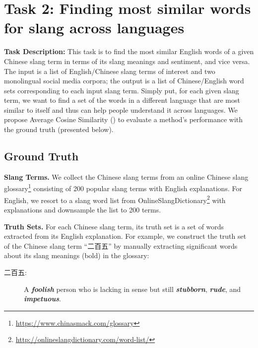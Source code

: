 \section{Task 2: Finding most similar words for slang across languages}
\label{sec:bleis}
\textbf{Task Description:} This task is to find the most similar English words of a given Chinese slang term in terms of its slang meanings and sentiment, and vice versa. 
The input is a list of English/Chinese slang terms of interest and two monolingual social media corpora; the output is a list of Chinese/English word sets corresponding to each input slang term.
Simply put, for each given slang term, we want to find a set of the words in a different language that are most similar to itself and thus can help people understand it across languages.
We propose Average Cosine Similarity () to evaluate a method's performance with the ground truth (presented below).

\subsection{Ground Truth}
\label{sec:ground}
\textbf{Slang Terms.}
We collect the Chinese slang terms from an online Chinese slang glossary\footnote{\scriptsize {\url{https://www.chinasmack.com/glossary}}} consisting of 200 popular slang terms with English explanations. 
For English, we resort to a slang word list from OnlineSlangDictionary\footnote{\scriptsize {\url{http://onlineslangdictionary.com/word-list/}}} with explanations and downsample the list to 200 terms.

\noindent
\textbf{Truth Sets.}
For each Chinese slang term, its truth set is a set of words extracted from its English explanation. 
For example, we construct the truth set of
the Chinese slang term ``二百五'' by manually extracting significant words about its slang meanings (bold) in the glossary:
\begin{description}
	\item[二百五:] A \textbf{\textit{foolish}} person who is lacking in sense but still \textbf{\textit{stubborn}}, \textbf{\textit{rude}}, and \textbf{\textit{impetuous}}.
\end{description}



